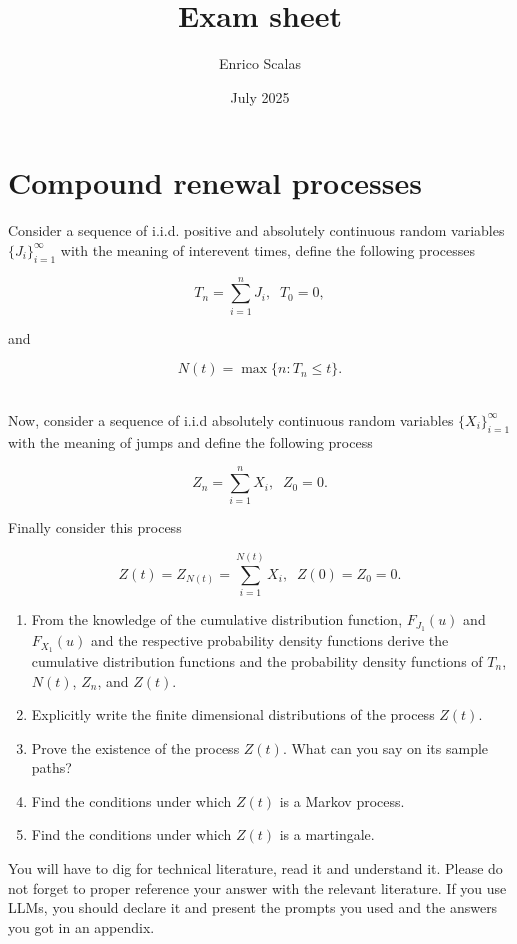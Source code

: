 \documentclass{article}
\title{Exam sheet}
\author{Enrico Scalas}
\date{July 2025}
\begin{document}
\maketitle

\section*{Compound renewal processes}

\noindent Consider a sequence of i.i.d. positive and absolutely continuous random variables $\{J_i\}_{i=1}^\infty$ with the meaning of interevent times, define the following processes

$$
T_n = \sum_{i=1}^n J_i, \; \; T_0 = 0,
$$

and

$$
N(t) = \max\{n: T_n \leq t \}.
$$

\\
\noindent 
Now, consider a sequence of i.i.d absolutely continuous random variables  $\{X_i\}_{i=1}^\infty$ with the meaning of jumps and define the following process

$$
Z_n = \sum_{i=1}^n X_i, \; \; Z_0 = 0.
$$

Finally consider this process

$$
Z(t) = Z_{N(t)} = \sum_{i=1}^{N(t)} X_i, \; \; Z(0) = Z_0 = 0.
$$

\begin{enumerate}
    \item From the knowledge of the cumulative distribution function, $F_{J_1} (u)$ and $F_{X_1} (u)$ and the respective probability density functions derive the cumulative distribution functions and the probability density functions of $T_n$, $N(t)$, $Z_n$, and $Z(t)$.
    \item Explicitly write the finite dimensional distributions of the process $Z(t)$.
    \item Prove the existence of the process $Z(t)$. What can you say on its sample paths?
    \item Find the conditions under which $Z(t)$ is a Markov process.
    \item Find the conditions under which $Z(t)$ is a martingale.
\end{enumerate}

\noindent You will have to dig for technical literature, read it and understand it. Please do not forget to proper reference your answer with the relevant literature. If you use LLMs, you should declare it and present the prompts you used and the answers you got in an appendix.



\end{document}
